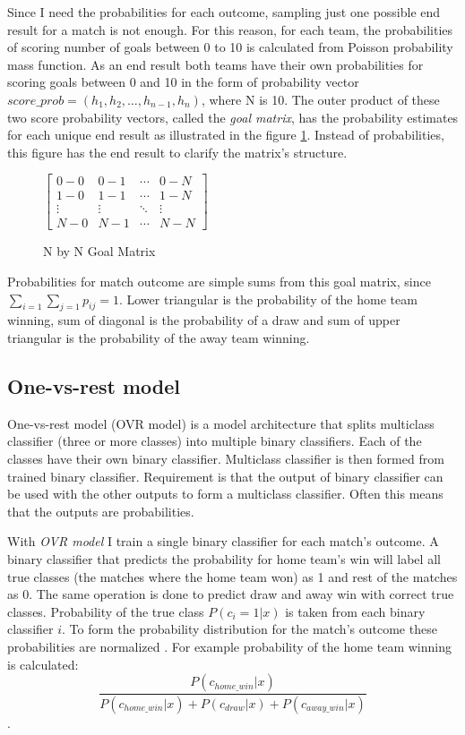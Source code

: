 Since I need the probabilities for each outcome, sampling just one possible end result for a match is not enough. For this reason, for each team, the probabilities of scoring number of goals between 0 to 10 is calculated from Poisson probability mass function. As an end result both teams have their own probabilities for scoring goals between 0 and 10 in the form of probability vector $score\_prob = \left( h _ { 1 } , h _ { 2 } , \dots , h _ { n - 1 } , h _ { n } \right)$, where N is 10. The outer product of these two score probability vectors, called the \textit{goal matrix}, has the probability estimates for each unique end result as illustrated in the figure \ref{fig:goal_matrix}. Instead of probabilities, this figure has the end result to clarify the matrix's structure.

\begin{figure}
    $\begin{bmatrix}
    0-0 & 0-1 & \cdots & 0-N \\
    1-0 & 1-1 & \cdots   &1-N \\
    \vdots & \vdots   & \ddots & \vdots \\
    N-0 & N-1 & \cdots & N-N\end{bmatrix}$
\caption{N by N Goal Matrix}
\label{fig:goal_matrix}
\end{figure}

Probabilities for match outcome are simple sums from this goal matrix, since $\sum_{i=1}\sum_{j=1}p_{ij} = 1$. Lower triangular is the probability of the home team winning, sum of diagonal is the probability of a draw and sum of upper triangular is the probability of the away team winning.

\subsection{One-vs-rest model}
One-vs-rest model (OVR model) is a model architecture that splits multiclass classifier (three or more classes) into multiple binary classifiers. Each of the classes have their own binary classifier. Multiclass classifier is then formed from trained binary classifier. Requirement is that the output of binary classifier can be used with the other outputs to form a multiclass classifier. Often this means that the outputs are probabilities.

With \textit{OVR model} I train a single binary classifier for each match's outcome. A binary classifier that predicts the probability for home team's win will label all true classes (the matches where the home team won) as 1 and rest of the matches as 0. The same operation is done to predict draw and away win with correct true classes. Probability of the true class $P(c_i = 1 | x)$ is taken from each binary classifier $i$. To form the probability distribution for the match's outcome these probabilities are normalized \cite{zadrozny2002transforming}. For example probability of the home team winning is calculated:
\begin{equation}
\frac{P(c_{home\_win}| x)}{P(c_{home\_win}| x) + P(c_{draw}| x) + P(c_{away\_win}| x)}
\end{equation}.

